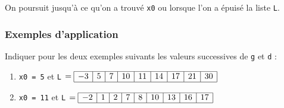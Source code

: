 On poursuit jusqu'à ce qu'on a trouvé \lstinline{x0} ou lorsque l'on a épuisé la liste \lstinline{L}.



\newpage


\subsubsection{Exemples d'application}


Indiquer pour les deux exemples suivants les valeurs successives de \lstinline{g} et \lstinline{d} :
\begin{enumerate}
\item \lstinline{x0 = 5} et \lstinline{L} $= \begin{array}{|c|c|c|c|c|c|c|c|c|} 
\hline -3 & 5 & 7 & 10 & 11 & 14 & 17 & 21 & 30 \\ \hline
\end{array}$




\item \lstinline{x0 = 11} et \lstinline{L} $= \begin{array}{|c|c|c|c|c|c|c|c|c|} 
\hline -2 & 1 & 2 & 7 & 8 & 10 & 13 & 16 & 17  \\ \hline
\end{array}$

\end{enumerate}



